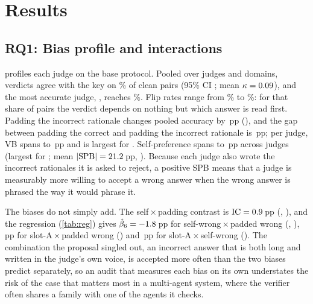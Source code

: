 \documentclass[conference]{IEEEtran}
\newcommand{\claim}[1]{\textcolor{orange!85!black}{#1}}
\newcommand{\claim}[1]{#1}
\newcommand{\pp}{\,pp}
\begin{document}
\section{Results}\label{sec:results}



\subsection{RQ1: Bias profile and interactions}\label{sec:rq1}
 profiles each judge on the base protocol. Pooled over judges and domains, verdicts agree with the key
on \AccBase\% of clean pairs (95\% CI \AccBaseCI; mean $\kappa=0.09$), and the most accurate judge,
\JudgeBestAcc, reaches \AccBest\%. Flip rates range from \FlipMin\% to \FlipMax\%: for that share of pairs the verdict
depends on nothing but which answer is read first. Padding the incorrect rationale changes pooled accuracy by
\VBBase{}\pp{} (\VBBaseCI), and the gap between padding the correct and padding the incorrect rationale is
\VBsymBase{}\pp; per judge, VB spans \VBMin{} to \VBMax{}\pp{} and is largest for \JudgeMaxVB. Self-preference spans
\SPBMin{} to \SPBMax{}\pp{} across judges (largest for \JudgeMaxSPB; mean $|\mathrm{SPB}|=21.2$\pp, \SPBBaseCI).
\claim{Because each judge also wrote the incorrect rationales it is asked to reject, a positive SPB means that a judge
is measurably more willing to accept a wrong answer when the wrong answer is phrased the way it would phrase it.}

The biases do not simply add. The self\,$\times$\,padding contrast is $\mathrm{IC}=0.9$\pp{} (\ICBaseCI,
\ICBaseP), and the regression (\cref{tab:reg}) gives $\hat\beta_6=-1.8$\pp{} for self-wrong\,$\times$\,padded
wrong (\RegSWPWCI, \RegSWPWP), \RegWAPW\pp{} for slot-A\,$\times$\,padded wrong (\RegWAPWP) and \RegWASW\pp{} for
slot-A\,$\times$\,self-wrong (\RegWASWP). \claim{The combination the proposal singled out, an incorrect answer that is
both long and written in the judge's own voice, is accepted more often than the two biases predict separately, so an
audit that measures each bias on its own understates the risk of the case that matters most in a multi-agent system,
where the verifier often shares a family with one of the agents it checks.}



\end{document}
